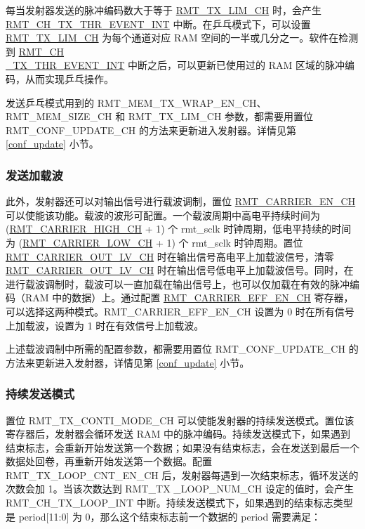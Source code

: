 \documentclass[main\_\_CN.tex]{subfiles}
\begin{document}
每当发射器发送的脉冲编码数大于等于 \hyperref[fielddesc:RMTTXLIMCHN]{RMT\_TX\_LIM\_CH} 时，会产生 \hyperref[int:RMTCHnTXTHREVENTINT]{RMT\_CH\_TX\_THR\_EVENT\_INT} 中断。在乒乓模式下，可以设置 \hyperref[fielddesc:RMTTXLIMCHN]{RMT\_TX\_LIM\_CH} 为每个通道对应 RAM 空间的一半或几分之一。软件在检测到 \hyperref[int:RMTCHnTXTHREVENTINT]{RMT\_CH\\\_TX\_THR\_EVENT\_INT} 中断之后，可以更新已使用过的 RAM 区域的脉冲编码，从而实现乒乓操作。

发送乒乓模式用到的 RMT\_MEM\_TX\_WRAP\_EN\_CH、RMT\_MEM\_SIZE\_CH 和 RMT\_TX\_LIM\_CH 参数，都需要用置位 RMT\_CONF\_UPDATE\_CH 的方法来更新进入发射器。详情见第 \ref{conf_update} 小节。

\subsubsection{发送加载波}

此外，发射器还可以对输出信号进行载波调制，置位 \hyperref[fielddesc:RMTCARRIERENCHN]{RMT\_CARRIER\_EN\_CH} 可以使能该功能。载波的波形可配置。一个载波周期中高电平持续时间为 (\hyperref[fielddesc:RMTCARRIERHIGHCHN]{RMT\_CARRIER\_HIGH\_CH} + 1) 个 rmt\_sclk 时钟周期，低电平持续的时间为 (\hyperref[fielddesc:RMTCARRIERLOWCHN]{RMT\_CARRIER\_LOW\_CH} + 1) 个 rmt\_sclk 时钟周期。置位 \hyperref[fielddesc:RMTCARRIEROUTLVCHN]{RMT\_CARRIER\_OUT\_LV\_CH} 时在输出信号高电平上加载波信号，清零 \hyperref[fielddesc:RMTCARRIEROUTLVCHN]{RMT\_CARRIER\_OUT\_LV\_CH} 时在输出信号低电平上加载波信号。同时，在进行载波调制时，载波可以一直加载在输出信号上，也可以仅加载在有效的脉冲编码（RAM 中的数据）上。通过配置 \hyperref[fielddesc:RMTCARRIEREFFENCHN]{RMT\_CARRIER\_EFF\_EN\_CH} 寄存器，可以选择这两种模式。RMT\_CARRIER\_EFF\_EN\_CH 设置为 0 时在所有信号上加载波，设置为 1 时在有效信号上加载波。

上述载波调制中所需的配置参数，都需要用置位 RMT\_CONF\_UPDATE\_CH 的方法来更新进入发射器，详情见第 \ref{conf_update} 小节。

\subsubsection{持续发送模式}

置位 RMT\_TX\_CONTI\_MODE\_CH 可以使能发射器的持续发送模式。置位该寄存器后，发射器会循环发送 RAM 中的脉冲编码。持续发送模式下，如果遇到结束标志，会重新开始发送第一个数据；如果没有结束标志，会在发送到最后一个数据处回卷，再重新开始发送第一个数据。配置 RMT\_TX\_LOOP\_CNT\_EN\_CH 后，发射器每遇到一次结束标志，循环发送的次数会加 1。当该次数达到 RMT\_TX \_LOOP\_NUM\_CH 设定的值时，会产生 RMT\_CH\_TX\_LOOP\_INT 中断。持续发送模式下，如果遇到的结束标志类型是 period[11:0] 为 0，那么这个结束标志前一个数据的 period 需要满足：
\end{document}

